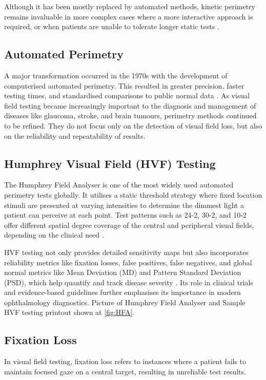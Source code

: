 \documentclass{l4proj}
\begin{document}
Although it has been mostly replaced by automated methods, kinetic perimetry remains invaluable in more complex cases where a more interactive approach is required, or when patients are unable to tolerate longer static tests \citep{vft3}.


\subsection{Automated Perimetry}
A major transformation occurred in the 1970s with the development of computerised automated perimetry. This resulted in greater precision, faster testing times, and standardised comparisons to public normal data \citep{vft1}. As visual field testing became increasingly important to the diagnosis and management of diseases like glaucoma, stroke, and brain tumours, perimetry methods continued to be refined. They do not focus only on the detection of visual field loss, but also on the reliability and repeatability of results.


\subsection{Humphrey Visual Field (HVF) Testing}
The Humphrey Field Analyser is one of the most widely used automated perimetry tests globally. It utilises a static threshold strategy where fixed location stimuli are presented at varying intensities to determine the dimmest light a patient can perceive at each point. Test patterns such as 24-2, 30-2, and 10-2 offer different spatial degree coverage of the central and peripheral visual fields, depending on the clinical need \citep{vftb}.

HVF testing not only provides detailed sensitivity maps but also incorporates reliability metrics like fixation losses, false positives, false negatives, and global normal metrics like Mean Deviation (MD) and Pattern Standard Deviation (PSD), which help quantify and track disease severity \citep{vftb}. Its role in clinical trials and evidence-based guidelines further emphasises its importance in modern ophthalmology diagnostics. Picture of Humphrey Field Analyser and Sample HVF testing printout shown at \ref{fig:HFA}.


\subsection{Fixation Loss}

In visual field testing, fixation loss \citep{vfta} refers to instances where a patient fails to maintain focused gaze on a central target, resulting in unreliable test results. \citep{vft8}
\end{document}
